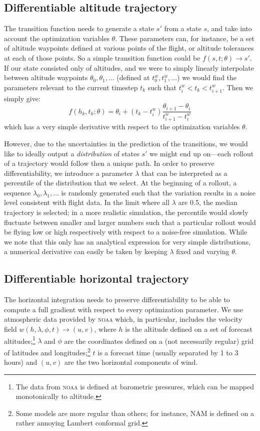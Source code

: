 \documentclass[11pt]{scrartcl} %
\begin{document}
\subsection{Differentiable altitude trajectory}
The transition function needs to generate a state $s'$ from a state $s$, and take into account the optimization variables $\theta$. These parameters can, for instance, be a set of altitude waypoints defined at various points of the flight, or altitude tolerances at each of those points. So a simple transition function could be $f(s, t; \theta) \to s'$. If our state consisted only of altitudes, and we were to simply linearly interpolate between altitude waypoints $\theta_0, \theta_1, \dots$ (defined at $t^w_0, t^w_1, \dots$) we would find the parameters relevant to the current timestep $t_k$ such that $t^w_i < t_k < t^w_{i+1}$. Then we simply give:
\[f(h_k, t_k; \theta) = \theta_i + (t_k - t_i^w) \frac{\theta_{i+1}-\theta_i}{t_{i+1}^w - t^w_i}\]
which has a very simple derivative with respect to the optimization variables $\theta$.

However, due to the uncertainties in the prediction of the transitions, we would like to ideally output a \emph{distribution} of states $s'$ we might end up on---each rollout of a trajectory would follow then a unique path. In order to preserve differentiability, we introduce a parameter $\lambda$ that can be interpreted as a percentile of the distribution that we select. At the beginning of a rollout, a sequence $\lambda_0, \lambda_1, \dots$ is randomly generated such that the variation results in a noise level consistent with flight data. In the limit where all $\lambda$ are 0.5, the median trajectory is selected; in a more realistic simulation, the percentile would slowly fluctuate between smaller and larger numbers such that a particular rollout would be flying low or high respectively with respect to a noise-free simulation. While we note that this only has an analytical expression for very simple distributions, a numerical derivative can easily be taken by keeping $\lambda$ fixed and varying $\theta$.

\subsection{Differentiable horizontal trajectory} \label{sec:horizontal}
The horizontal integration needs to preserve differentiability to be able to compute a full gradient with respect to every optimization parameter. We use atmospheric data provided by \textsc{noaa} which, in particular, includes the velocity field $w(h, \lambda, \phi, t)\to(u, v)$, where $h$ is the altitude defined on a set of forecast altitudes;\footnote{The data from \textsc{noaa} is defined at barometric pressures, which can be mapped monotonically to altitude.} $\lambda$ and $\phi$ are the coordinates defined on a (not necessarily regular) grid of latitudes and longitudes;\footnote{Some models are more regular than others; for instance, NAM is defined on a rather annoying Lambert conformal grid.} $t$ is a forecast time (usually separated by 1 to 3 hours) and $(u, v)$ are the two horizontal components of wind.
\end{document}
